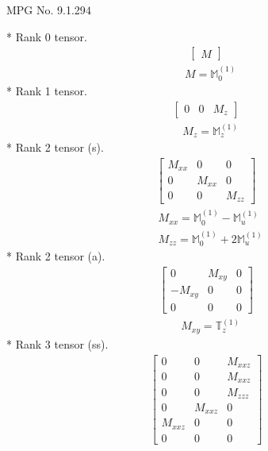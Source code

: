 \documentclass[fleqn,8pt,landscape]{jsarticle}
\begin{document}
\setcounter{MaxMatrixCols}{32}

\renewcommand{\tablename}{Table~}
\renewcommand{\figurename}{Figure~}
\begin{center}
\LARGE
MPG No. 9.1.29\quad$4$
\end{center}
* Rank 0 tensor.
\begin{align*}
\begin{bmatrix} M \end{bmatrix}
\end{align*}
\begin{align*}
& M = \mathbb{M}_{0}^{(1)}
\end{align*}
* Rank 1 tensor.
\begin{align*}
\begin{bmatrix} 0 & 0 & M_{z} \end{bmatrix}
\end{align*}
\begin{align*}
& M_{z} = \mathbb{M}_{z}^{(1)}
\end{align*}
* Rank 2 tensor (s).
\begin{align*}
\begin{bmatrix} M_{xx} & 0 & 0 \\ 0 & M_{xx} & 0 \\ 0 & 0 & M_{zz} \end{bmatrix}
\end{align*}
\begin{align*}
& M_{xx} = \mathbb{M}_{0}^{(1)} - \mathbb{M}_{u}^{(1)} \\
& M_{zz} = \mathbb{M}_{0}^{(1)} + 2 \mathbb{M}_{u}^{(1)}
\end{align*}
* Rank 2 tensor (a).
\begin{align*}
\begin{bmatrix} 0 & M_{xy} & 0 \\ - M_{xy} & 0 & 0 \\ 0 & 0 & 0 \end{bmatrix}
\end{align*}
\begin{align*}
& M_{xy} = \mathbb{T}_{z}^{(1)}
\end{align*}
* Rank 3 tensor (ss).
\begin{align*}
\begin{bmatrix} 0 & 0 & M_{xxz} \\ 0 & 0 & M_{xxz} \\ 0 & 0 & M_{zzz} \\ 0 & M_{xxz} & 0 \\ M_{xxz} & 0 & 0 \\ 0 & 0 & 0 \end{bmatrix}
\end{align*}
\end{document}
